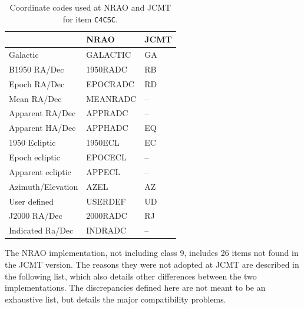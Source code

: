 \documentclass[final,authoryear,5p,times,twocolumn]{elsarticle}
\begin{document}
\begin{table}
\caption{Coordinate codes used at NRAO and JCMT for item
  \texttt{C4CSC}.}
\label{tab:coordcodes}
\begin{center}
\begin{tabular}{lll}
\hline
 & NRAO & JCMT \\ \hline
Galactic & GALACTIC & GA \\
B1950 RA/Dec & 1950RADC & RB \\
Epoch RA/Dec & EPOCRADC & RD \\
Mean RA/Dec & MEANRADC & -- \\
Apparent RA/Dec & APPRADC & -- \\
Apparent HA/Dec & APPHADC & EQ \\
1950 Ecliptic & 1950ECL & EC \\
Epoch ecliptic & EPOCECL & -- \\
Apparent ecliptic & APPECL & -- \\
Azimuth/Elevation & AZEL & AZ \\
User defined & USERDEF & UD \\
J2000 RA/Dec & 2000RADC & RJ \\
Indicated Ra/Dec & INDRADC & -- \\
\hline
\end{tabular}
\end{center}
\end{table}

The NRAO implementation, not including class 9, includes 26 items not
found in the JCMT version. The reasons they were not adopted at JCMT
are described in the following list, which also details other
differences between the two implementations. The discrepancies defined
here are not meant to be an exhaustive list, but details the major
compatibility problems.
\end{document}
